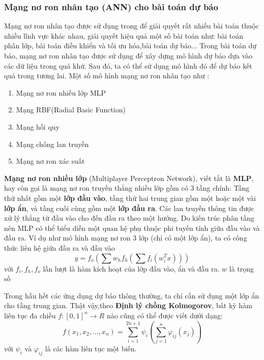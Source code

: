 \subsubsection{Mạng nơ ron nhân tạo (ANN) cho bài toán dự báo}
Mạng nơ ron nhân tạo được sử dụng trong để giải quyết rất nhiều bài toán thuộc nhiều lĩnh vực khác nhau, giải quyết hiệu quả một số bài toán như: bài toán phân lớp, bài toán điều khiển và tối ưu hóa,bài toán dự báo... Trong bài toán dự báo, mạng nơ ron nhân tạo được sử dụng để xây dựng mô hình dự báo dựa vào các dữ liệu trong quá khứ. Sau đó, ta có thể sử dụng mô hình đó để dự báo kết quả trong tương lai. Một số mô hình mạng nơ ron nhân tạo như :
\begin{enumerate}
\item {Mạng nơ ron nhiều lớp MLP}
\item {Mạng RBF}(Radial Basic Function)
\item {Mạng hồi quy}
\item {Mạng chống lan truyền}
\item {Mạng nơ ron xác suất}
\end{enumerate}

\textbf{Mạng nơ ron nhiều lớp} (Multiplayer Perceptron Network), viết tắt là \textbf{MLP}, hay còn gọi là mạng nơ ron truyền thẳng nhiều lớp gồm có 3 tầng chính: Tầng thứ nhất gồm một \textbf{lớp đầu vào}, tầng thứ hai trung gian gồm một hoặc một vài \textbf{lớp ẩn}, và tầng cuối cùng gồm một \textbf{lớp đầu ra}. Các lan truyền thông tin được xử lý thẳng từ đầu vào cho đến đầu ra theo một hướng. 
Do kiến trúc phân tầng nên MLP có thể biểu diễn một quan hệ phụ thuộc phi tuyến tính giữa đầu vào và đầu ra. Ví dụ như mô hình mạng nơ ron 3 lớp (chỉ có một lớp ẩn), ta có công thức liên hệ giữa đầu ra và đầu vào
\begin{equation}
	y = f_o(\sum{w_h}f_h(\sum{f}_i(w_i^Tx)))
\end{equation}
với $f_i, f_h, f_o$ lần lượt là hàm kích hoạt của lớp đầu vào, ẩn và đầu ra. $w$ là trọng số

Trong hầu hết các ứng dụng dự báo thông thường, ta chỉ cần sử dụng một lớp ẩn cho tầng trung gian. Thật vậy,theo \textbf{Định lý chồng Kolmogorov}\citep{char07}, bất kỳ hàm liên tục đa chiều $f:[0,1]^n \rightarrow R$ nào cũng có thể được viết dưới dạng:
\begin{equation}
	f(x_1,x_2,...,x_n) = \sum\limits_{i=1}^{2n+1} \psi_i(\sum\limits^{n}_{j=1}\varphi_{ij}(x_j))
\end{equation} 
với $\psi_i$ và $\varphi_{ij}$ là các hàm liên tục một biến.

